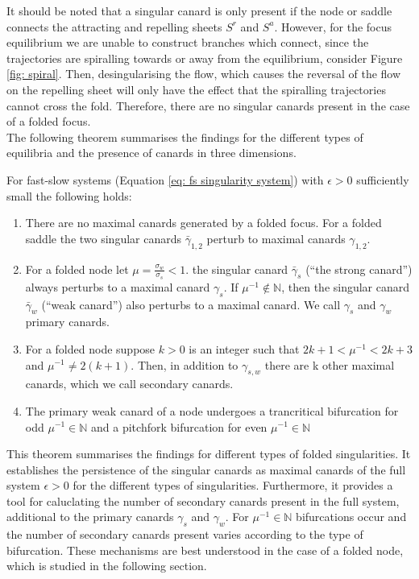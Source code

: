 It should be noted that a singular canard is only present if the node or saddle connects the attracting and repelling sheets $ S^r $ and $ S^a $.
However, for the focus equilibrium we are unable to construct branches which connect, since the trajectories are spiralling towards or away from the equilibrium, consider Figure \ref{fig: spiral}. Then, desingularising the flow, which causes the reversal of the flow on the repelling sheet will only have the effect that the spiralling trajectories cannot cross the fold. Therefore, there are no singular canards present in the case of a folded focus.\\

The following theorem summarises the findings for the different types of equilibria and the presence of canards in three dimensions.
\begin{theorem}\label{thm: canards in R3}
	For fast-slow systems (Equation \ref{eq: fs singularity system}) with $ \epsilon>0 $ sufficiently small the following holds:
\begin{enumerate}
\item  There are no maximal canards generated by a folded focus. For a folded saddle the two singular canards $ \bar{\gamma}_{1,2} $ perturb to maximal canards $ \gamma_{1,2} $.
\item  For a folded node let $\mu=\frac{\sigma_w}{\sigma_s} <1$. the singular canard $ \bar{\gamma}_{s} $ (``the strong canard'') always perturbs to a maximal canard $ \gamma_{s} $. If $ \mu^{-1}\not \in \mathbb{N} $, then the singular canard $ \bar{\gamma}_{w} $ (``weak canard'') also perturbs to a maximal canard. We call $ \gamma_{s} $ and $ \gamma_{w} $ primary canards.
\item For a folded node suppose $ k>0 $ is an integer such that $ 2k+1<\mu^{-1} <2k+3$ and $ \mu^{-1}\neq 2(k+1) $. Then, in addition to $ \gamma_{s,w} $ there are k other maximal canards, which we call secondary canards.
\item The primary weak canard of a node undergoes a trancritical bifurcation for odd $ \mu^{-1}\in\mathbb{N} $ and a pitchfork bifurcation for even $ \mu^{-1}\in\mathbb{N} $
\end{enumerate}
\end{theorem}
This theorem summarises the findings for different types of folded singularities. It establishes the persistence of the singular canards as maximal canards of the full system $\epsilon >0$ for the different types of singularities. Furthermore, it provides a tool for caluclating the number of secondary canards present in the full system, additional to the primary canards $\gamma_s$ and $\gamma_w$.
For $ \mu^{-1}\in\mathbb{N} $ bifurcations occur and the number of secondary canards present varies according to the type of bifurcation.
These mechanisms are best understood in the case of a folded node, which is studied in the following section.


